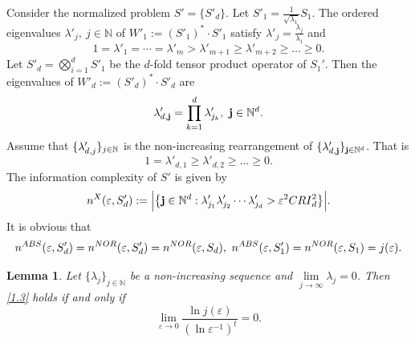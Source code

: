 \documentclass[10pt,a4paper]{amsart}
\newtheorem{lem}[thm]{Lemma}
\numberwithin{equation}{section}
\def\vz{\varepsilon}
\def\lz{\lambda}
\newcommand{\NN}{\mathbb{N}}
\newcommand{\bsj}{\oldsymbol{j}}
\def\NN{{\mathbb N}}
\def\bsj{{\bf j}}
\begin{document}
Consider the normalized problem $S'=\{S'_d\}$. Let
$S'_1=\frac{1}{\sqrt{\lambda_1}}S_1$. The ordered eigenvalues
$\lz'_j,\ {j\in \NN}$ of $W'_1:= (S'_1)^ * \cdot S'_1$ satisfy
$\lz'_j=\frac{\lz_j}{\lz_1}$ and
$$1=\lz'_1=\cdots=\lz'_m>\lz'_{m+1}\ge\lz'_{m+2}\ge\dots\ge0.$$
Let $S'_d=\bigotimes\limits_{i=1}^{d}S'_1$ be the $d$-fold tensor
product operator of $S_1'$. Then the eigenvalues of
$W'_{d}:=(S'_{d})^*\cdot S'_{d}$ are
$$\lz'_{d,\bsj}=\prod_{k=1}^d \lz'_{j_k},\ \bsj\in \Bbb N^d.$$
Assume that $\{\lambda'_{d,j}\}_{j\in\Bbb N}$ is the
non-increasing rearrangement of $\{\lz'_{d,\bsj}\}_{\bsj\in\Bbb
N^d}$. That is
$$1=\lz'_{d,1}\ge \lz'_{d,2}\ge \dots \ge 0.$$
The information complexity of $S'$ is given by
 $$n^{X}(\vz,S'_d):= \Big|\big\{\bsj \in \NN^d : \lambda'_{j_1} \lambda'_{j_2}\cdots
  \lambda'_{j_d}> \varepsilon^2 {\rm CRI}^2_d  \big\}\Big|.$$
It is obvious that
$$n^{\rm ABS}(\vz,S'_d)=n^{\rm NOR}(\vz,S'_d)=n^{\rm NOR}(\vz,S_d), \ n^{\rm ABS}(\vz,S'_1)=n^{\rm NOR}(\vz,S_1)=j(\vz).$$




\begin{lem}\label{lem1}
 Let $\{\lambda_j\}_{j\in\NN}$ be a non-increasing sequence and $\lim\limits_{j\rightarrow\infty}\lambda_j=0$. Then \eqref{1.3}   holds if and only if
 \begin{equation}\label{2.2}
 \lim_{\vz\to 0}\frac{\ln j(\vz)}{(\ln\vz^{-1})^t}=0.
\end{equation}
\end{lem}
\end{document}

